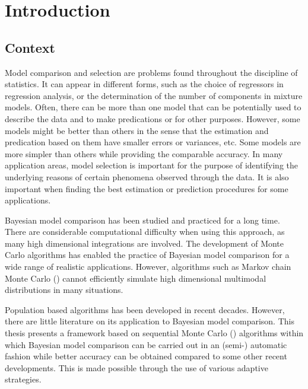 \chapter{Introduction}
\label{cha:Introduction}

\section{Context}
\label{sec:Context}


Model comparison and selection are problems found throughout the discipline of
statistics. It can appear in different forms, such as the choice of regressors
in regression analysis, or the determination of the number of components in
mixture models. Often, there can be more than one model that can be
potentially used to describe the data and to make predications or for other
purposes. However, some models might be better than others in the sense that
the estimation and predication based on them have smaller errors or variances,
etc. Some models are more simpler than others while providing the comparable
accuracy. In many application areas, model selection is important for the
purpose of identifying the underlying reasons of certain phenomena observed
through the data. It is also important when finding the best estimation or
prediction procedures for some applications.

Bayesian model comparison has been studied and practiced for a long time.
There are considerable computational difficulty when using this approach, as
many high dimensional integrations are involved. The development of Monte
Carlo algorithms has enabled the practice of Bayesian model comparison for a
wide range of realistic applications. However, algorithms such as Markov chain
Monte Carlo (\mcmc) cannot efficiently simulate high dimensional multimodal
distributions in many situations.

Population based algorithms has been developed in recent decades. However,
there are little literature on its application to Bayesian model comparison.
This thesis presents a framework based on sequential Monte Carlo (\smc)
algorithms within which Bayesian model comparison can be carried out in an
(semi-) automatic fashion while better accuracy can be obtained compared to
some other recent developments. This is made possible through the use of
various adaptive strategies.

